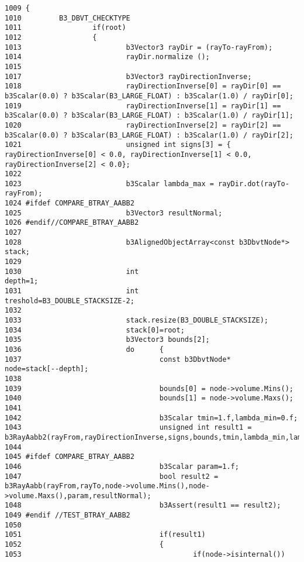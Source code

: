 \begin{Code}\begin{verbatim}1009 {
1010         B3_DBVT_CHECKTYPE
1011                 if(root)
1012                 {
1013                         b3Vector3 rayDir = (rayTo-rayFrom);
1014                         rayDir.normalize ();
1015 
1017                         b3Vector3 rayDirectionInverse;
1018                         rayDirectionInverse[0] = rayDir[0] == b3Scalar(0.0) ? b3Scalar(B3_LARGE_FLOAT) : b3Scalar(1.0) / rayDir[0];
1019                         rayDirectionInverse[1] = rayDir[1] == b3Scalar(0.0) ? b3Scalar(B3_LARGE_FLOAT) : b3Scalar(1.0) / rayDir[1];
1020                         rayDirectionInverse[2] = rayDir[2] == b3Scalar(0.0) ? b3Scalar(B3_LARGE_FLOAT) : b3Scalar(1.0) / rayDir[2];
1021                         unsigned int signs[3] = { rayDirectionInverse[0] < 0.0, rayDirectionInverse[1] < 0.0, rayDirectionInverse[2] < 0.0};
1022 
1023                         b3Scalar lambda_max = rayDir.dot(rayTo-rayFrom);
1024 #ifdef COMPARE_BTRAY_AABB2
1025                         b3Vector3 resultNormal;
1026 #endif//COMPARE_BTRAY_AABB2
1027                         
1028                         b3AlignedObjectArray<const b3DbvtNode*> stack;
1029 
1030                         int                                                             depth=1;
1031                         int                                                             treshold=B3_DOUBLE_STACKSIZE-2;
1032 
1033                         stack.resize(B3_DOUBLE_STACKSIZE);
1034                         stack[0]=root;
1035                         b3Vector3 bounds[2];
1036                         do      {
1037                                 const b3DbvtNode*       node=stack[--depth];
1038 
1039                                 bounds[0] = node->volume.Mins();
1040                                 bounds[1] = node->volume.Maxs();
1041                                 
1042                                 b3Scalar tmin=1.f,lambda_min=0.f;
1043                                 unsigned int result1 = b3RayAabb2(rayFrom,rayDirectionInverse,signs,bounds,tmin,lambda_min,lambda_max);
1044 
1045 #ifdef COMPARE_BTRAY_AABB2
1046                                 b3Scalar param=1.f;
1047                                 bool result2 = b3RayAabb(rayFrom,rayTo,node->volume.Mins(),node->volume.Maxs(),param,resultNormal);
1048                                 b3Assert(result1 == result2);
1049 #endif //TEST_BTRAY_AABB2
1050 
1051                                 if(result1)
1052                                 {
1053                                         if(node->isinternal())

\end{verbatim}
\end{Code}
